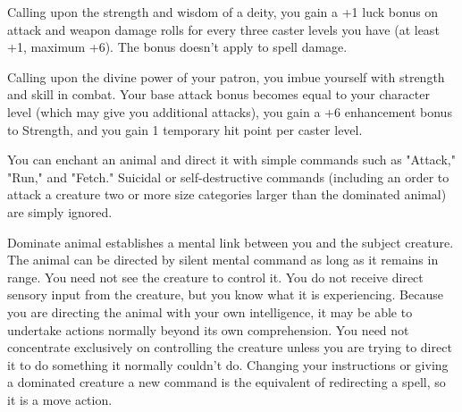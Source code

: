 \begin{multicols}{2}
\begin{small}
\noindent Calling upon the strength and wisdom of a deity, you gain a +1 luck bonus on attack and weapon damage rolls for every three caster levels you have (at least +1, maximum +6). The bonus doesn't apply to spell damage.

\noindent Calling upon the divine power of your patron, you imbue yourself with strength and skill in combat. Your base attack bonus becomes equal to your character level (which may give you additional attacks), you gain a +6 enhancement bonus to Strength, and you gain 1 temporary hit point per caster level.

\noindent You can enchant an animal and direct it with simple commands such as "Attack," "Run," and "Fetch." Suicidal or self-destructive commands (including an order to attack a creature two or more size categories larger than the dominated animal) are simply ignored.

\smallskip\noindent Dominate animal establishes a mental link between you and the subject creature. The animal can be directed by silent mental command as long as it remains in range. You need not see the creature to control it. You do not receive direct sensory input from the creature, but you know what it is experiencing. Because you are directing the animal with your own intelligence, it may be able to undertake actions normally beyond its own comprehension. You need not concentrate exclusively on controlling the creature unless you are trying to direct it to do something it normally couldn't do. Changing your instructions or giving a dominated creature a new command is the equivalent of redirecting a spell, so it is a move action.


\end{small}
\end{multicols}
